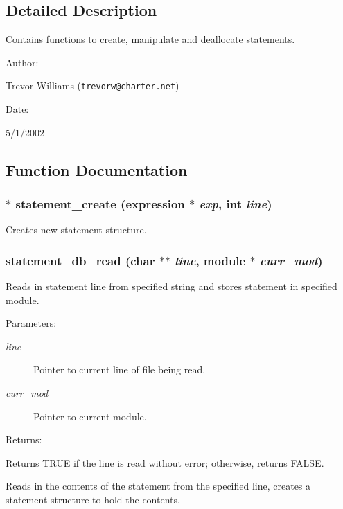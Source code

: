 \subsection{Detailed Description}
Contains functions to create, manipulate and deallocate statements.



\begin{Desc}
\item[Author: ]\par
Trevor Williams ({\tt trevorw@charter.net}) \end{Desc}
\begin{Desc}
\item[Date: ]\par
5/1/2002\end{Desc}


\subsection{Function Documentation}
\subsubsection{$\ast$ statement\_\-create ({\bf expression} $\ast$ {\em exp}, int {\em line})}\label{statement_8h_a0}


Creates new statement structure.

\subsubsection{ statement\_\-db\_\-read (char $\ast$$\ast$ {\em line}, {\bf module} $\ast$ {\em curr\_\-mod})}\label{statement_8h_a2}


Reads in statement line from specified string and stores statement in specified module.

\begin{Desc}
\item[Parameters: ]\par
\begin{description}
\item[{\em 
line}]Pointer to current line of file being read. \item[{\em 
curr\_\-mod}]Pointer to current module.\end{description}
\end{Desc}
\begin{Desc}
\item[Returns: ]\par
Returns TRUE if the line is read without error; otherwise, returns FALSE.\end{Desc}
Reads in the contents of the statement from the specified line, creates a statement structure to hold the contents. 
